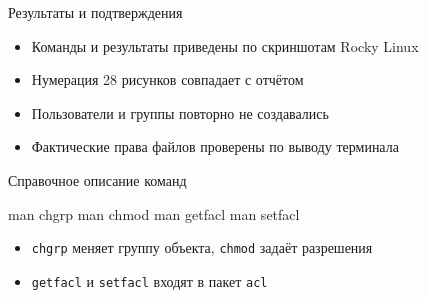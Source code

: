 \documentclass[
  ignorenonframetext,
  aspectratio=169,
  russian,
]{beamer}
\newenvironment{Shaded}{\begin{snugshade}}{\end{snugshade}}
\newcommand{\FunctionTok}[1]{\textcolor[rgb]{0.28,0.35,0.67}{#1}}
\newcommand{\NormalTok}[1]{\textcolor[rgb]{0.00,0.23,0.31}{#1}}
\providecommand{\tightlist}{%
  \setlength{\itemsep}{0pt}\setlength{\parskip}{0pt}}
\begin{document}
\begin{frame}{Результаты и подтверждения}
\protect{}\label{ux440ux435ux437ux443ux43bux44cux442ux430ux442ux44b-ux438-ux43fux43eux434ux442ux432ux435ux440ux436ux434ux435ux43dux438ux44f}
\begin{itemize}
\tightlist
\item
  Команды и результаты приведены по скриншотам Rocky Linux
\item
  Нумерация 28 рисунков совпадает с отчётом
\item
  Пользователи и группы повторно не создавались
\item
  Фактические права файлов проверены по выводу терминала
\end{itemize}
\end{frame}

\begin{frame}[fragile]{Справочное описание команд}
\protect{}\label{ux441ux43fux440ux430ux432ux43eux447ux43dux43eux435-ux43eux43fux438ux441ux430ux43dux438ux435-ux43aux43eux43cux430ux43dux434}
\begin{Shaded}
\begin{Highlighting}[]
\FunctionTok{man}\NormalTok{ chgrp}
\FunctionTok{man}\NormalTok{ chmod}
\FunctionTok{man}\NormalTok{ getfacl}
\FunctionTok{man}\NormalTok{ setfacl}
\end{Highlighting}
\end{Shaded}

\begin{itemize}
\tightlist
\item
  \texttt{chgrp} меняет группу объекта, \texttt{chmod} задаёт разрешения
\item
  \texttt{getfacl} и \texttt{setfacl} входят в пакет \texttt{acl}
\end{itemize}
\end{frame}
\end{document}
